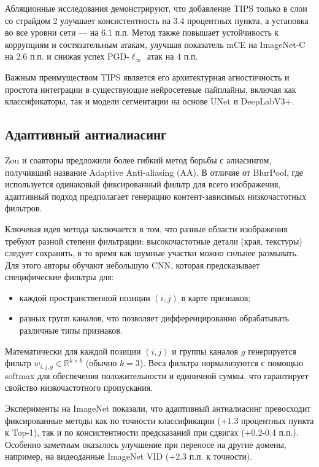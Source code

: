 Абляционные исследования демонстрируют, что добавление TIPS только в слои со страйдом 2 улучшает консистентность на 3.4 процентных пункта, а установка во все уровни сети — на 6.1 п.п. Метод также повышает устойчивость к коррупциям и состязательным атакам, улучшая показатель mCE на ImageNet-C на 2.6 п.п. и снижая успех PGD-$\ell_\infty$ атак на 4 п.п.

Важным преимуществом TIPS является его архитектурная агностичность и простота интеграции в существующие нейросетевые пайплайны, включая как классификаторы, так и модели сегментации на основе UNet и DeepLabV3+.

\subsection{Адаптивный антиалиасинг}
\label{review:antialias:adaptive}

Zou и соавторы \cite{Zou2020} предложили более гибкий метод борьбы с алиасингом, получивший название Adaptive Anti-aliasing (AA). В отличие от BlurPool, где используется одинаковый фиксированный фильтр для всего изображения, адаптивный подход предполагает генерацию контент-зависимых низкочастотных фильтров.

Ключевая идея метода заключается в том, что разные области изображения требуют разной степени фильтрации: высокочастотные детали (края, текстуры) следует сохранять, в то время как шумные участки можно сильнее размывать. Для этого авторы обучают небольшую CNN, которая предсказывает специфические фильтры для:
\begin{itemize}
    \item каждой пространственной позиции $(i,j)$ в карте признаков;
    \item разных групп каналов, что позволяет дифференцированно обрабатывать различные типы признаков.
\end{itemize}

Математически для каждой позиции $(i,j)$ и группы каналов $g$ генерируется фильтр $w_{i,j,g} \in \mathbb{R}^{k\times k}$ (обычно $k=3$). Веса фильтра нормализуются с помощью softmax для обеспечения положительности и единичной суммы, что гарантирует свойство низкочастотного пропускания.

Эксперименты на ImageNet показали, что адаптивный антиалиасинг превосходит фиксированные методы как по точности классификации (+1.3 процентных пункта к Top-1), так и по консистентности предсказаний при сдвигах (+0.2-0.4 п.п.). Особенно заметным оказалось улучшение при переносе на другие домены, например, на видеоданные ImageNet VID (+2.3 п.п. к точности).


